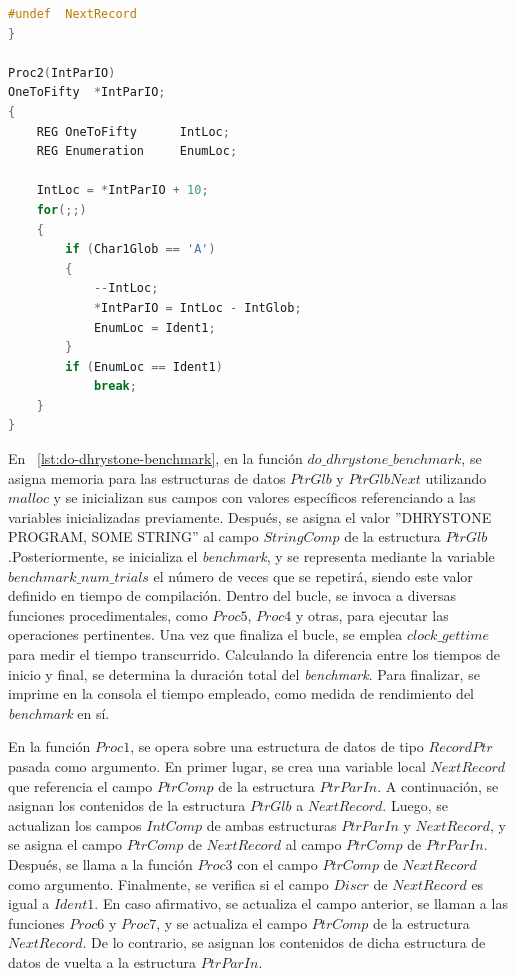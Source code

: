\begin{lstlisting}[language=C,frame=single,showstringspaces=false,caption={Código fuente de la función do-dhrystone-benchmark},label=lst:do-dhrystone-benchmark]
#undef	NextRecord
}

Proc2(IntParIO)
OneToFifty	*IntParIO;
{
	REG OneToFifty		IntLoc;
	REG Enumeration		EnumLoc;

	IntLoc = *IntParIO + 10;
	for(;;)
	{
		if (Char1Glob == 'A')
		{
			--IntLoc;
			*IntParIO = IntLoc - IntGlob;
			EnumLoc = Ident1;
		}
		if (EnumLoc == Ident1)
			break;
	}
}
\end{lstlisting}

En ~\ref{lst:do-dhrystone-benchmark}, en la función $do\_dhrystone\_benchmark$, se asigna memoria para las estructuras de datos $PtrGlb$ y $PtrGlbNext$ utilizando $malloc$ y se inicializan sus campos con valores específicos referenciando a las variables inicializadas previamente. Después, se asigna el valor ''DHRYSTONE PROGRAM, SOME STRING'' al campo $StringComp$ de la estructura $PtrGlb$.Posteriormente, se inicializa el \textit{benchmark}, y se representa mediante la variable \newline $benchmark\_num\_trials$ el número de veces que se repetirá, siendo este valor definido en tiempo de compilación. Dentro del bucle, se invoca a diversas funciones procedimentales, como $Proc5$, $Proc4$ y otras, para ejecutar las operaciones pertinentes. Una vez que finaliza el bucle, se emplea $clock\_gettime$ para medir el tiempo transcurrido. Calculando la diferencia entre los tiempos de inicio y final, se determina la duración total del \textit{benchmark}. Para finalizar, se imprime en la consola el tiempo empleado, como medida de rendimiento del \textit{benchmark} en sí.

En la función $Proc1$, se opera sobre una estructura de datos de tipo $RecordPtr$ pasada como argumento. En primer lugar, se crea una variable local $NextRecord$ que referencia el campo $PtrComp$ de la estructura $PtrParIn$. A continuación, se asignan los contenidos de la estructura $PtrGlb$ a $NextRecord$. Luego, se actualizan los campos $IntComp$ de ambas estructuras $PtrParIn$ y $NextRecord$, y se asigna el campo $PtrComp$ de $NextRecord$ al campo $PtrComp$ de $PtrParIn$. Después, se llama a la función $Proc3$ con el campo $PtrComp$ de $NextRecord$ como argumento. Finalmente, se verifica si el campo $Discr$ de $NextRecord$ es igual a $Ident1$. En caso afirmativo, se actualiza el campo anterior, se llaman a las funciones $Proc6$ y $Proc7$, y se actualiza el campo $PtrComp$ de la estructura $NextRecord$. De lo contrario, se asignan los contenidos de dicha estructura de datos de vuelta a la estructura $PtrParIn$. 

